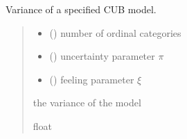 \documentclass[letterpaper,10pt,english]{sphinxmanual}
\begin{document}
\begin{fulllineitems}
\label{\detokenize{cubmods:cubmods.cub.var}}
\pysigstartsignatures
{}
\pysigstopsignatures
\sphinxAtStartPar
Variance of a specified CUB model.
\begin{quote}\begin{description}
\begin{itemize}
\item {} 
\sphinxAtStartPar
{} () \textendash{} number of ordinal categories

\item {} 
\sphinxAtStartPar
{} () \textendash{} uncertainty parameter \(\pi\)

\item {} 
\sphinxAtStartPar
{} () \textendash{} feeling parameter \(\xi\)

\end{itemize}

\sphinxAtStartPar
the variance of the model

\sphinxAtStartPar
float

\end{description}\end{quote}

\end{fulllineitems}

\end{document}
